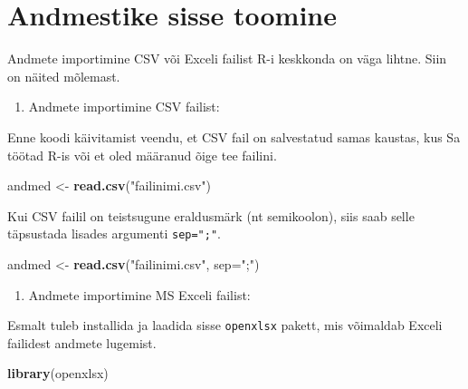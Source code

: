 \documentclass[
]{book}
\newenvironment{Shaded}{\begin{snugshade}}{\end{snugshade}}
\newcommand{\AttributeTok}[1]{\textcolor[rgb]{0.13,0.29,0.53}{#1}}
\newcommand{\FunctionTok}[1]{\textcolor[rgb]{0.13,0.29,0.53}{\textbf{#1}}}
\newcommand{\NormalTok}[1]{#1}
\newcommand{\OtherTok}[1]{\textcolor[rgb]{0.56,0.35,0.01}{#1}}
\newcommand{\StringTok}[1]{\textcolor[rgb]{0.31,0.60,0.02}{#1}}
\providecommand{\tightlist}{%
  \setlength{\itemsep}{0pt}\setlength{\parskip}{0pt}}
\renewenvironment{Shaded} {\begin{snugshade}\footnotesize} {\end{snugshade}}
\begin{document}
\section{Andmestike sisse toomine}\label{andmestike-sisse-toomine}

Andmete importimine CSV või Exceli failist R-i keskkonda on väga lihtne. Siin on näited mõlemast.

\begin{enumerate}
\def\labelenumi{\arabic{enumi}.}
\tightlist
\item
  Andmete importimine CSV failist:
\end{enumerate}

Enne koodi käivitamist veendu, et CSV fail on salvestatud samas kaustas, kus Sa töötad R-is või et oled määranud õige tee failini.

\begin{Shaded}
\begin{Highlighting}[]
\NormalTok{andmed }\OtherTok{\textless{}{-}} \FunctionTok{read.csv}\NormalTok{(}\StringTok{"failinimi.csv"}\NormalTok{)}
\end{Highlighting}
\end{Shaded}

Kui CSV failil on teistsugune eraldusmärk (nt semikoolon), siis saab selle täpsustada lisades argumenti \texttt{sep=";"}.

\begin{Shaded}
\begin{Highlighting}[]
\NormalTok{andmed }\OtherTok{\textless{}{-}} \FunctionTok{read.csv}\NormalTok{(}\StringTok{"failinimi.csv"}\NormalTok{, }\AttributeTok{sep=}\StringTok{";"}\NormalTok{)}
\end{Highlighting}
\end{Shaded}

\begin{enumerate}
\def\labelenumi{\arabic{enumi}.}
\setcounter{enumi}{1}
\tightlist
\item
  Andmete importimine MS Exceli failist:
\end{enumerate}

Esmalt tuleb installida ja laadida sisse \texttt{openxlsx} pakett, mis võimaldab Exceli failidest andmete lugemist.

\begin{Shaded}
\begin{Highlighting}[]
\FunctionTok{library}\NormalTok{(openxlsx)}
\end{Highlighting}
\end{Shaded}
\end{document}
